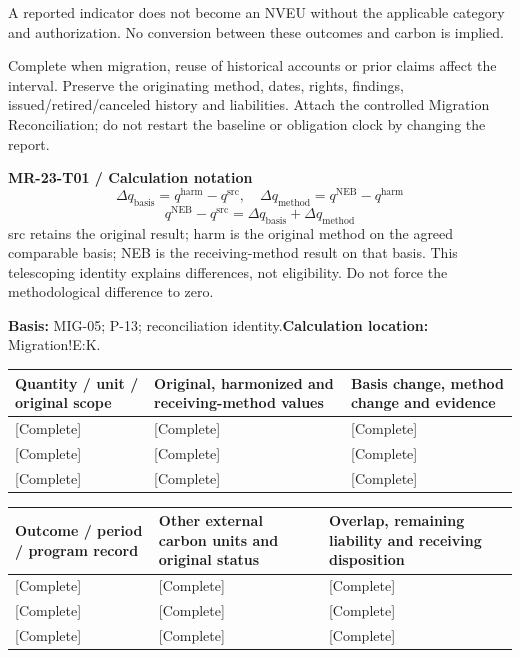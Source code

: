 A reported indicator does not become an NVEU without the applicable category and authorization. No conversion between these outcomes and carbon is implied.\par
{}
Complete when migration, reuse of historical accounts or prior claims affect the interval. Preserve the originating method, dates, rights, findings, issued/retired/canceled history and liabilities. Attach the controlled Migration Reconciliation; do not restart the baseline or obligation clock by changing the report.\par
{}
\par\begingroup\sffamily\fontsize{8.4}{10.5}\selectfont\color{NEBGreen}
\textbf{MR-23-T01 / Calculation notation}\
{\fontsize{10}{12}\selectfont\[\Delta q_{\mathrm{basis}}=q^{\mathrm{harm}}-q^{\mathrm{src}},\quad \Delta q_{\mathrm{method}}=q^{\mathrm{NEB}}-q^{\mathrm{harm}}\]}
{\fontsize{10}{12}\selectfont\[q^{\mathrm{NEB}}-q^{\mathrm{src}}=\Delta q_{\mathrm{basis}}+\Delta q_{\mathrm{method}}\]}
src retains the original result; harm is the original method on the agreed comparable basis; NEB is the receiving-method result on that basis. This telescoping identity explains differences, not eligibility. Do not force the methodological difference to zero.\par
\textbf{Basis:} MIG-05; P-13; reconciliation identity.\quad\textbf{Calculation location:} Migration!E:K.\par\endgroup
{\sffamily\fontsize{8.6}{10.7}\selectfont\begin{longtable}{@{}P{48mm}P{61mm}P{53mm}@{}}
\toprule
\textbf{Quantity / unit / original scope} & \textbf{Original, harmonized and receiving-method values} & \textbf{Basis change, method change and evidence}\\\midrule\endhead
\rule{0pt}{8mm}[Complete] & [Complete] & [Complete]\\\hline
\rule{0pt}{8mm}[Complete] & [Complete] & [Complete]\\\hline
\rule{0pt}{8mm}[Complete] & [Complete] & [Complete]\\\hline
\end{longtable}}
{\sffamily\fontsize{8.6}{10.7}\selectfont\begin{longtable}{@{}P{48mm}P{61mm}P{53mm}@{}}
\toprule
\textbf{Outcome / period / program record} & \textbf{Other external carbon units and original status} & \textbf{Overlap, remaining liability and receiving disposition}\\\midrule\endhead
\rule{0pt}{8mm}[Complete] & [Complete] & [Complete]\\\hline
\rule{0pt}{8mm}[Complete] & [Complete] & [Complete]\\\hline
\rule{0pt}{8mm}[Complete] & [Complete] & [Complete]\\\hline
\end{longtable}}
